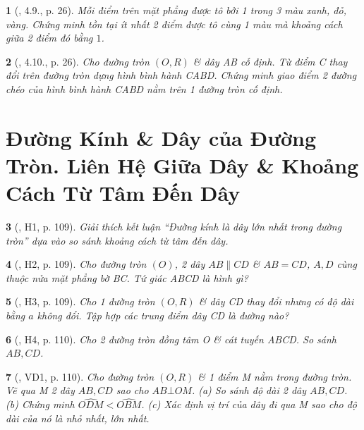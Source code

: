 \documentclass{article}
\newtheorem{baitoan}{}
\begin{document}
\begin{baitoan}[\cite{TLCT_THCS_Toan_9_hinh_hoc}, 4.9., p. 26]
	Mỗi điểm trên mặt phẳng được tô bởi 1 trong 3 màu xanh, đỏ, vàng. Chứng minh tồn tại ít nhất 2 điểm được tô cùng 1 màu mà khoảng cách giữa 2 điểm đó bằng $1$.
\end{baitoan}

\begin{baitoan}[\cite{TLCT_THCS_Toan_9_hinh_hoc}, 4.10., p. 26]
	Cho đường tròn $(O,R)$ \& dây AB cố định. Từ điểm C thay đổi trên đường tròn dựng hình bình hành CABD. Chứng minh giao điểm 2 đường chéo của hình bình hành CABD nằm trên 1 đường tròn cố định.
\end{baitoan}


\section{Đường Kính \& Dây của Đường Tròn. Liên Hệ Giữa Dây \& Khoảng Cách Từ Tâm Đến Dây}

\begin{baitoan}[\cite{Binh_boi_duong_Toan_9_tap_1}, H1, p. 109]
	Giải thích kết luận ``Đường kính là dây lớn nhất trong đường tròn'' dựa vào so sánh khoảng cách từ tâm đến dây.
\end{baitoan}

\begin{baitoan}[\cite{Binh_boi_duong_Toan_9_tap_1}, H2, p. 109]
	Cho đường tròn $(O)$, 2 dây $AB\parallel CD$ \& $AB = CD$, $A,D$ cùng thuộc nửa mặt phẳng bờ BC. Tứ giác ABCD là hình gì?
\end{baitoan}

\begin{baitoan}[\cite{Binh_boi_duong_Toan_9_tap_1}, H3, p. 109]
	Cho 1 đường tròn $(O,R)$ \& dây CD thay đổi nhưng có độ dài bằng $a$ không đổi. Tập hợp các trung điểm dây CD là đường nào?
\end{baitoan}

\begin{baitoan}[\cite{Binh_boi_duong_Toan_9_tap_1}, H4, p. 110]
	Cho 2 đường tròn đồng tâm O \& cát tuyến ABCD. So sánh $AB,CD$.
\end{baitoan}

\begin{baitoan}[\cite{Binh_boi_duong_Toan_9_tap_1}, VD1, p. 110]
	Cho đường tròn $(O,R)$ \& 1 điểm M nằm trong đường tròn. Vẽ qua M 2 dây $AB,CD$ sao cho $AB\bot OM$. (a) So sánh độ dài 2 dây $AB,CD$. (b) Chứng minh $\widehat{ODM} < \widehat{OBM}$. (c) Xác định vị trí của dây đi qua M sao cho độ dài của nó là nhỏ nhất, lớn nhất.
\end{baitoan}
\end{document}
